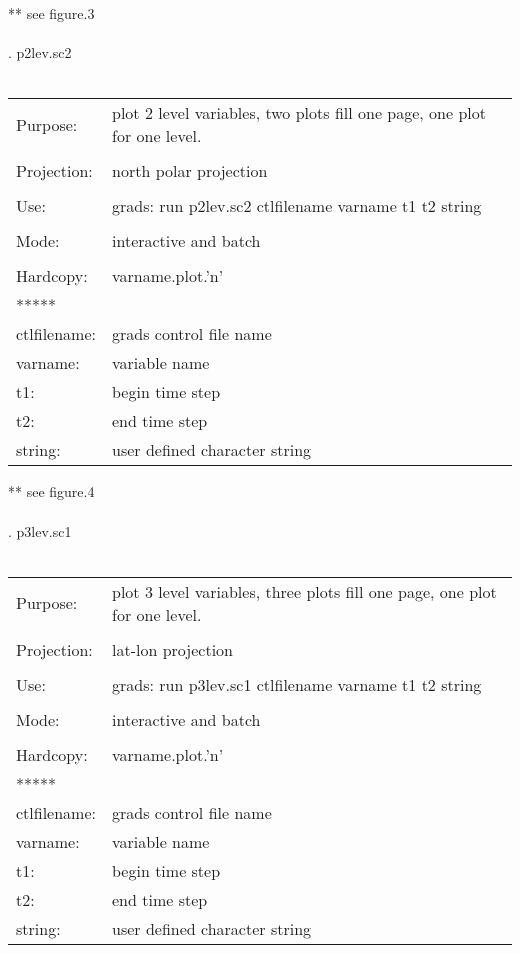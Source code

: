 ** see figure.3
\\
\\ 
. p2lev.sc2 \\ \\
\begin{tabular}{ll}
Purpose:     &  plot 2 level variables, two plots fill one page, one plot for one level.\\
\\
Projection:  &  north polar projection                                                  \\
\\
Use:         &  grads: run p2lev.sc2 ctlfilename varname t1 t2  string                  \\
\\
Mode:        &  interactive and batch                                                   \\
\\
Hardcopy:    &  varname.plot.'n'                                                        \\
*****  \\ 
ctlfilename: &  grads control file name     \\ 
varname:     &  variable name       \\
t1:       &  begin time step     \\
t2:       &  end time step  \\
string:   &   user defined character string 
\end{tabular}
** see figure.4
\\ 
\\
\newpage
{}. p3lev.sc1 \\ \\
\begin{tabular}{ll}
Purpose:     &  plot 3 level variables, three plots fill one page, one plot for one level.\\
\\
Projection:  &  lat-lon projection                                                    \\
\\
Use:         &  grads: run p3lev.sc1 ctlfilename varname t1 t2 string                 \\
\\
Mode:        &  interactive and batch                                                 \\
\\
Hardcopy:    &  varname.plot.'n'                                                      \\
*****  \\
ctlfilename: &  grads control file name   \\
varname:     &  variable name       \\
t1:       &  begin time step    \\ 
t2:       &  end time step  \\
string:   &   user defined character string  
\end{tabular}

